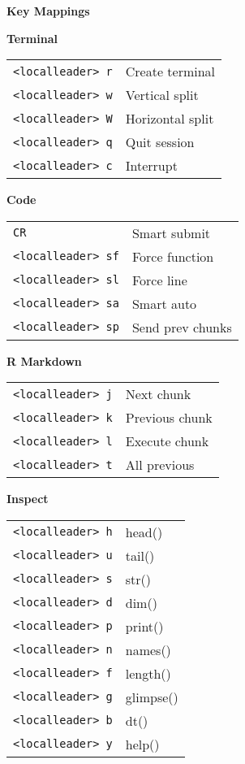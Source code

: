 \documentclass[10pt,a4paper]{article}
\begin{document}
\begin{multicols}{3}
\footnotesize

\textbf{Key Mappings}

\textbf{Terminal}\\
\begin{tabular}{@{}L{2.44cm}L{3.51cm}@{}}
\texttt{<localleader> r} & Create terminal \\
\texttt{<localleader> w} & Vertical split \\
\texttt{<localleader> W} & Horizontal split \\
\texttt{<localleader> q} & Quit session \\
\texttt{<localleader> c} & Interrupt \\
\end{tabular}

\vspace{3pt}
\textbf{Code}\\
\begin{tabular}{@{}L{2.44cm}L{3.51cm}@{}}
\texttt{CR} & Smart submit \\
\texttt{<localleader> sf} & Force function \\
\texttt{<localleader> sl} & Force line \\
\texttt{<localleader> sa} & Smart auto \\
\texttt{<localleader> sp} & Send prev chunks \\
\end{tabular}

\vspace{3pt}
\textbf{R Markdown}\\
\begin{tabular}{@{}L{2.44cm}L{3.51cm}@{}}
\texttt{<localleader> j} & Next chunk \\
\texttt{<localleader> k} & Previous chunk \\
\texttt{<localleader> l} & Execute chunk \\
\texttt{<localleader> t} & All previous \\
\end{tabular}

\vspace{3pt}
\textbf{Inspect}\\
\begin{tabular}{@{}L{2.44cm}L{3.51cm}@{}}
\texttt{<localleader> h} & head() \\
\texttt{<localleader> u} & tail() \\
\texttt{<localleader> s} & str() \\
\texttt{<localleader> d} & dim() \\
\texttt{<localleader> p} & print() \\
\texttt{<localleader> n} & names() \\
\texttt{<localleader> f} & length() \\
\texttt{<localleader> g} & glimpse() \\
\texttt{<localleader> b} & dt() \\
\texttt{<localleader> y} & help() \\
\end{tabular}


\end{multicols}
\end{document}
